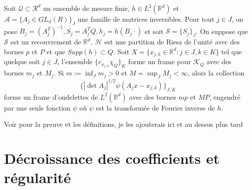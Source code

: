 \begin{theoreme}
	Soit $\mathcal{Q} \subset \mathcal{R}^d$ un ensemble de mesure finie, $h \in L^2(\mathbb{R}^d)$
	et $\mathcal{A} =\{A_j \in GL_d(R)\}_J$ une famille de matrices inversibles.
	\newline
	Pour tout $j \in J$, on pose $B_j =(A_j^T)^{-1}, S_j = A_j^TQ, h_j = h(B_j \cdot)$
	et soit $\mathcal{S} = \{S_j\}_J$.
	\newline
	On suppose que $\mathcal{S}$ est un recouvrement de $\mathbb{R}^d$, $\mathcal{H}$ est une partition de Riesz de l'unité avec des bornes $p$ et $P$ et que $Supp(h) \subset Q$.
	\newline
	Soit $X = \{x_{j,k} \in \mathbb{R}^d : j\in J, k \in K\}$ tel que quelque soit $j \in J$, 
	l'ensemble $\{e_{x_{j,k}}\chi_Q\}_K$ forme un frame pour $\mathcal{K}_Q$ avec des bornes $m_j$ et $M_j$. 
	\newline
	Si $m := \inf_J m_j > 0$ et $M= \sup_J M_j < \infty$, alors la collection
	\begin{equation*}
		\{|\det A_j|^{1/2} \psi(A_j x - x_{j,k})\}_{J, K}
	\end{equation*}
	forme un frame d'ondelettes de $L^2(\mathbb{R}^d)$ avec des bornes $mp$ et $MP$, 
	engendré par une seule fonction $\psi$ où $\psi$ est la transformée de Fourier inverse de $h$.
\end{theoreme}
\begin{preuve}
	Voir \cite{IrregWav} pour la preuve et les définitions, je les ajouterais ici et au dessus plus tard %
\end{preuve}

\section{Décroissance des coefficients et régularité}
